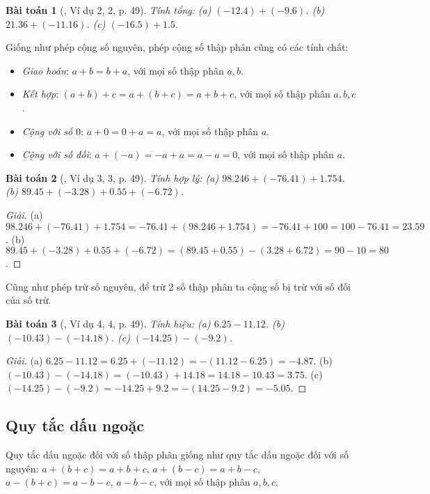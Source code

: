 \documentclass{article}
\newtheorem{baitoan}{Bài toán}
\begin{document}
\begin{baitoan}[\cite{SGK_Toan_6_Canh_Dieu_tap_2}, Ví dụ 2, 2, p. 49]
	Tính tổng: (a) $(-12.4) + (-9.6)$. (b) $21.36 + (-11.16)$. (c) $(-16.5) + 1.5$.
\end{baitoan}
Giống như phép cộng số nguyên, phép cộng số thập phân cũng có các tính chất:
\begin{itemize}
	\item \textit{Giao hoán}: $a + b = b + a$, với mọi số thập phân $a,b$.
	\item \textit{Kết hợp}: $(a + b) + c = a + (b + c) = a + b + c$, với mọi số thập phân $a,b,c$.
	\item \textit{Cộng với số $0$}: $a + 0 = 0 + a = a$, với mọi số thập phân $a$.
	\item \textit{Cộng với số đối}: $a + (-a) = -a + a = a - a = 0$, với mọi số thập phân $a$.
\end{itemize}

\begin{baitoan}[\cite{SGK_Toan_6_Canh_Dieu_tap_2}, Ví dụ 3, 3, p. 49]
	Tính hợp lý: (a) $98.246 + (-76.41) + 1.754$. (b) $89.45 + (-3.28) + 0.55 + (-6.72)$.
\end{baitoan}

\begin{proof}[Giải]
	(a) $98.246 + (-76.41) + 1.754 = -76.41 + (98.246 + 1.754) = -76.41 + 100 = 100 - 76.41 = 23.59$. (b) $89.45 + (-3.28) + 0.55 + (-6.72) = (89.45 + 0.55) - (3.28 + 6.72) = 90 - 10 = 80$.
\end{proof}
Cũng như phép trừ số nguyên, để trừ 2 số thập phân ta cộng số bị trừ với số đối của số trừ.

\begin{baitoan}[\cite{SGK_Toan_6_Canh_Dieu_tap_2}, Ví dụ 4, 4, p. 49]
	Tính hiệu: (a) $6.25 - 11.12$. (b) $(-10.43) - (-14.18)$. (c) $(-14.25) - (-9.2)$.
\end{baitoan}

\begin{proof}[Giải]
	(a) $6.25 - 11.12 = 6.25 + (-11.12) = -(11.12 - 6.25) = -4.87$. (b) $(-10.43) - (-14.18) = (-10.43) + 14.18 = 14.18 - 10.43 = 3.75$. (c) $(-14.25) - (-9.2) = -14.25 + 9.2 = -(14.25 - 9.2) = -5.05$.
\end{proof}

\subsection{Quy tắc dấu ngoặc}
Quy tắc dấu ngoặc đối với số thập phân giống như quy tắc dấu ngoặc đối với số nguyên: $a + (b + c) = a + b + c$, $a + (b - c) = a + b - c$, $a - (b + c) = a - b - c$, $a - b - c$, với mọi số thập phân $a,b,c$.
\end{document}
